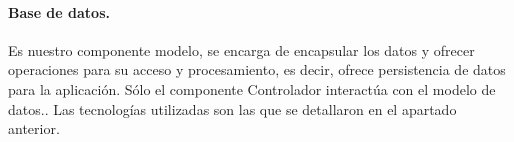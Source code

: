 \paragraph{Base de datos.} Es nuestro componente modelo, se encarga de encapsular 
los datos y ofrecer operaciones para su acceso y procesamiento, es decir, ofrece persistencia de datos para la aplicación. Sólo el componente
Controlador interactúa con el modelo de datos..\newline\newline
Las tecnologías utilizadas son las que se detallaron en el apartado anterior.